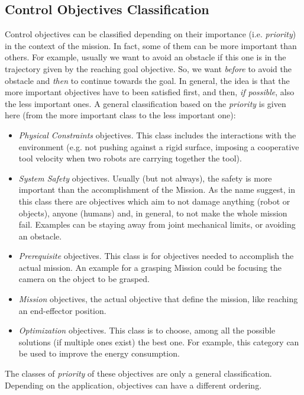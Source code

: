 \subsection{Control Objectives Classification}
\label{sec:coClass}
Control objectives can be classified depending on their importance (i.e. \textit{priority}) in the context of the mission. In fact, some of them can be more important than others. For example, usually we want to avoid an obstacle if this one is in the trajectory given by the reaching goal objective. So, we want \textit{before} to avoid the obstacle and \textit{then} to continue towards the goal. In general, the idea is that the more important objectives have to been satisfied first, and then, \textit{if possible}, also the less important ones. 
A general classification based on the \textit{priority} is given here (from the more important class to the less important one):
\begin{itemize}
	\item \textit{Physical Constraints} objectives. This class includes the interactions with the environment (e.g. not pushing against a rigid surface, imposing a cooperative tool velocity when two robots are carrying together the tool).
	\item \textit{System Safety} objectives. Usually (but not always), the safety is more important than the accomplishment of the Mission. As the name suggest, in this class there are objectives which aim to not damage anything (robot or objects), anyone (humans) and, in general, to not make the whole mission fail. Examples can be staying away from joint mechanical limits, or avoiding an obstacle.
	\item \textit{Prerequisite} objectives. This class is for objectives needed to accomplish the actual mission. An example for a grasping Mission could be focusing the camera on the object to be grasped.
	\item \textit{Mission} objectives, the actual objective that define the mission, like reaching an end-effector position.
	\item \textit{Optimization} objectives. This class is to choose, among all the possible solutions (if multiple ones exist) the best one. For example, this category can be used to improve the energy consumption.
\end{itemize}
The classes of \textit{priority} of these objectives are only a general classification. Depending on the application, objectives can have a different ordering.

